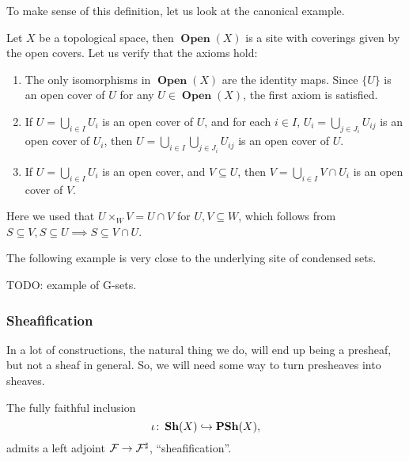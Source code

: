 \documentclass{article}
\DeclareMathOperator{\Open}{\mathbf{Open}}
\begin{document}
To make sense of this definition, let us look at the
canonical example.
\begin{example}
    Let $X$ be a topological space, then $\Open(X)$ is a
    site with coverings given by the open covers.
    Let us verify that the axioms hold:
    \begin{enumerate}
        \item The only isomorphisms in $\Open(X)$ are the identity maps.
              Since $\{U\}$ is an open cover of $U$ for any $U \in \Open(X)$,
              the first axiom is satisfied.
        \item If $U = \bigcup_{i\in I} U_i$ is an open cover of $U$,
              and for each $i \in I$, $U_i = \bigcup_{j\in J_i} U_{ij}$ is an
              open cover of $U_i$, then $U = \bigcup_{i\in I}\bigcup_{j \in J_i} U_{ij}$
              is an open cover of $U$.
        \item If $U = \bigcup_{i\in I} U_i$ is an open cover, and $V \subseteq U$, then
              $V = \bigcup_{i \in I} V \cap U_i$ is an open cover of $V$.
    \end{enumerate}
    Here we used that $U\times_W V = U\cap V$ for $U, V \subseteq W$,
    which follows from $S \subseteq V, S \subseteq U \implies S \subseteq V\cap U$.
\end{example}

The following example is very close to the underlying
site of condensed sets.
\begin{example}
    TODO: example of G-sets.
\end{example}

\subsubsection{Sheafification}
In a lot of constructions, the natural thing we do, will end up
being a presheaf, but not a sheaf in general. So, we will need some way to turn
presheaves into sheaves.
\begin{prop}
    The fully faithful inclusion
    \begin{equation*}
        \iota \colon \operatorname{\mathbf{Sh}}(X) \hookrightarrow \operatorname{\mathbf{PSh}}(X),
    \end{equation*}
    admits a left adjoint $\mathcal{F} \to \mathcal{F}^\sharp$, ``sheafification''.
\end{prop}
\end{document}
